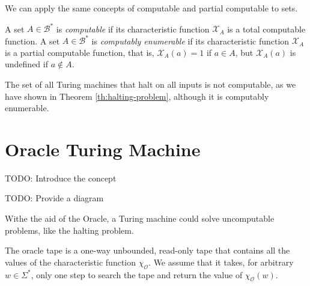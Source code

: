 We can apply the same concepts of computable and partial computable to sets.

\begin{definition}
A set $A \in \mathcal{B}^\ast$ is \emph{computable} if its characteristic function $\mathcal{X}_A$ is a total computable function. A set $A \in \mathcal{B}^\ast$ is \emph{computably enumerable} if its characteristic function $\mathcal{X}_A$ is a partial computable function, that is, $\mathcal{X}_A(a) = 1$ if $a \in A$, but $\mathcal{X}_A(a)$ is undefined if $a \not\in A$.
\end{definition}

\begin{example}
The set of all Turing machines that halt on all inputs is not computable, as we have shown in Theorem \ref{th:halting-problem}, although it is computably enumerable.
\end{example}

%
%

\section{Oracle Turing Machine}
\label{sec:oracle_turing_machine}

{\color{red} TODO: Introduce the concept}

{\color{red} TODO: Provide a diagram}

Withe the aid of the Oracle, a Turing machine could solve uncomputable problems, like the halting problem.

{\color{red} The oracle tape is a one-way unbounded, read-only tape that contains all the values of the characteristic function $\chi_\mathcal{O}$. We assume that it takes, for arbitrary $w \in \Sigma^\ast$, only one step to search the tape and return the value of $\chi_\mathcal{O}(w)$.}

